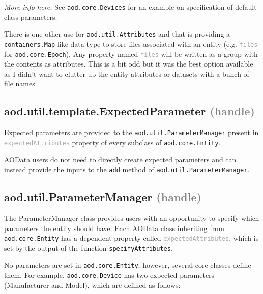 \documentclass[10pt]{exam}
\newcommand\myparent[1]{\textcolor{gray}{(#1)}}
\newcommand\aodclass[1]{\textcolor{codeblue}{\texttt{#1}}}
\newcommand\aodprop[1]{\textcolor{darkgray}{\texttt{#1}}}
\newcommand\aodfcn[1]{\textcolor{darkteal}{\texttt{#1}}}
\begin{document}
		\textit{More info here.} See \aodclass{aod.core.Devices} for an example on specification of default class parameters.
		
		There is one other use for \aodclass{aod.util.Attributes} and that is providing a \aodclass{containers.Map}-like data type to store files associated with an entity (e.g. \aodprop{files} for \aodclass{aod.core.Epoch}). Any property named \aodprop{files} will be written as a group with the contents as attributes. This is a bit odd but it was the best option available as I didn't want to clutter up the entity attributes or datasets with a bunch of file names.
	
	\subsection{aod.util.template.ExpectedParameter \myparent{handle}}
		\label{subsection:ExpectedParameter}

		Expected parameters are provided to the \aodclass{aod.util.ParameterManager} present in \aodprop{expectedAttributes} property of every subclass of \aodclass{aod.core.Entity}. 

		AOData users do not need to directly create expected parameters and can instead provide the inputs to the \aodfcn{add} method of \aodclass{aod.util.ParameterManager}. 
	
	\subsection{aod.util.ParameterManager \myparent{handle}}
		\label{subsection:ParameterManager}
		\noindent The ParameterManager class provides users with an opportunity to specify which parameters the entity should have. 
		Each AOData class inheriting from \aodclass{aod.core.Entity} has a dependent property called \aodprop{expectedAttributes}, which is set by the output of the function \aodfcn{specifyAttributes}. 

		No parameters are set in \aodclass{aod.core.Entity}; however, several core classes define them. For example, \aodclass{aod.core.Device} has two expected parameters (Manufacturer and Model), which are defined as follows: 
\end{document}
